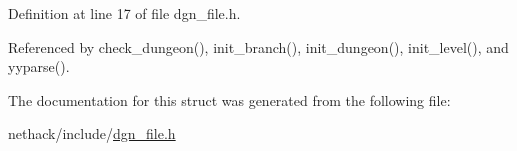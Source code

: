 Definition at line 17 of file dgn\+\_\+file.\+h.



Referenced by check\+\_\+dungeon(), init\+\_\+branch(), init\+\_\+dungeon(), init\+\_\+level(), and yyparse().



The documentation for this struct was generated from the following file\+:\begin{DoxyCompactItemize}
\item 
nethack/include/\hyperlink{dgn__file_8h}{dgn\+\_\+file.\+h}\end{DoxyCompactItemize}
